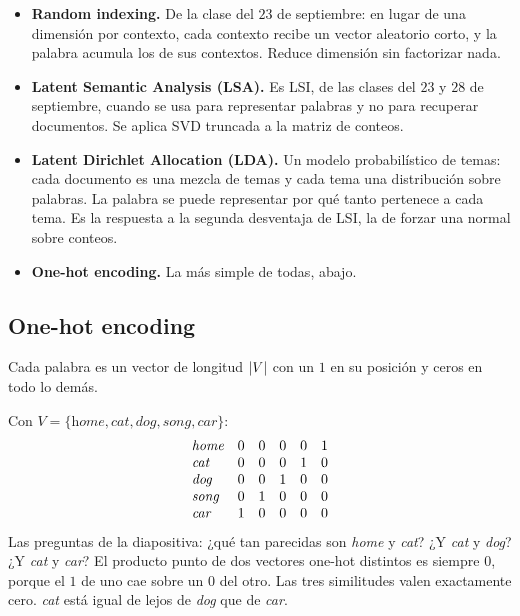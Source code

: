 \documentclass[11pt,letterpaper]{article}
\begin{document}
\begin{itemize}[itemsep=0.3em]
    \item \textbf{Random indexing.} De la clase del $23$ de septiembre:
          en lugar de una dimensión por contexto, cada contexto recibe
          un vector aleatorio corto, y la palabra acumula los de sus
          contextos. Reduce dimensión sin factorizar nada.
    \item \textbf{Latent Semantic Analysis (LSA).} Es LSI, de las
          clases del $23$ y $28$ de septiembre, cuando se usa para
          representar palabras y no para recuperar documentos. Se
          aplica SVD truncada a la matriz de conteos.
    \item \textbf{Latent Dirichlet Allocation (LDA).} Un modelo
          probabilístico de temas: cada documento es una mezcla de
          temas y cada tema una distribución sobre palabras. La palabra
          se puede representar por qué tanto pertenece a cada tema. Es
          la respuesta a la segunda desventaja de LSI, la de forzar una
          normal sobre conteos.
    \item \textbf{One-hot encoding.} La más simple de todas, abajo.
\end{itemize}


\subsection*{One-hot encoding}

Cada palabra es un vector de longitud $\left\lvert V \right\rvert$ con un $1$ en su
posición y ceros en todo lo demás.

\begin{ejemplo}
    Con $V = \{\textit{home}, \textit{cat}, \textit{dog},
    \textit{song}, \textit{car}\}$:
    \[
        \begin{array}{l@{\quad}ccccc}
            \textit{home} & 0 & 0 & 0 & 0 & 1 \\
            \textit{cat}  & 0 & 0 & 0 & 1 & 0 \\
            \textit{dog}  & 0 & 0 & 1 & 0 & 0 \\
            \textit{song} & 0 & 1 & 0 & 0 & 0 \\
            \textit{car}  & 1 & 0 & 0 & 0 & 0
        \end{array}
    \]
    Las preguntas de la diapositiva: ¿qué tan parecidas son
    \textit{home} y \textit{cat}? ¿Y \textit{cat} y \textit{dog}? ¿Y
    \textit{cat} y \textit{car}? El producto punto de dos vectores
    one-hot distintos es siempre $0$, porque el $1$ de uno cae sobre un
    $0$ del otro. Las tres similitudes valen exactamente cero.
    \textit{cat} está igual de lejos de \textit{dog} que de
    \textit{car}.
\end{ejemplo}
\end{document}
